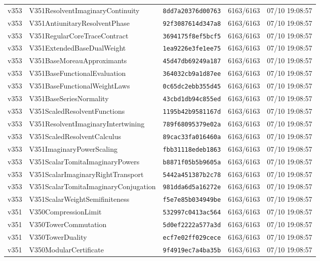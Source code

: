 \documentclass[11pt]{article}
\theoremstyle{definition}\newtheorem{deriv}{Derivation}
\begin{document}
{\begin{longtable}{@{}lllll@{}}
v353 & V351ResolventImaginaryContinuity & \texttt{8dd7a20376d00763} & 6163/6163 & 07/10 19:08:57 \\
v353 & V351AntiunitaryResolventPhase & \texttt{92f3087614d347a8} & 6163/6163 & 07/10 19:08:57 \\
v353 & V351RegularCoreTraceContract & \texttt{3694175f8ef5bcf5} & 6163/6163 & 07/10 19:08:57 \\
v353 & V351ExtendedBaseDualWeight & \texttt{1ea9226e3fe1ee75} & 6163/6163 & 07/10 19:08:57 \\
v353 & V351BaseMoreauApproximants & \texttt{45d47db69249a187} & 6163/6163 & 07/10 19:08:57 \\
v353 & V351BaseFunctionalEvaluation & \texttt{364032cb9a1d87ee} & 6163/6163 & 07/10 19:08:57 \\
v353 & V351BaseFunctionalWeightLaws & \texttt{0c65dc2ebb355d45} & 6163/6163 & 07/10 19:08:57 \\
v353 & V351BaseSeriesNormality & \texttt{43cbd1db94c855ed} & 6163/6163 & 07/10 19:08:57 \\
v353 & V351ScaledResolventFunctions & \texttt{1195b42b9581167d} & 6163/6163 & 07/10 19:08:57 \\
v353 & V351ResolventImaginaryIntertwining & \texttt{789f68095379e02a} & 6163/6163 & 07/10 19:08:57 \\
v353 & V351ScaledResolventCalculus & \texttt{89cac33fa016460a} & 6163/6163 & 07/10 19:08:57 \\
v353 & V351ImaginaryPowerScaling & \texttt{fbb31118edeb1863} & 6163/6163 & 07/10 19:08:57 \\
v353 & V351ScalarTomitaImaginaryPowers & \texttt{b8871f05b5b9605a} & 6163/6163 & 07/10 19:08:57 \\
v353 & V351ScalarImaginaryRightTransport & \texttt{5442a451387b2c78} & 6163/6163 & 07/10 19:08:57 \\
v353 & V351ScalarTomitaImaginaryConjugation & \texttt{981dda6d5a16272e} & 6163/6163 & 07/10 19:08:57 \\
v353 & V351ScalarWeightSemifiniteness & \texttt{f5e7e85b034949be} & 6163/6163 & 07/10 19:08:57 \\
v351 & V350CompressionLimit & \texttt{532997c0413ac564} & 6163/6163 & 07/10 19:08:57 \\
v351 & V350TowerCommutation & \texttt{5d0ef2222a577a3d} & 6163/6163 & 07/10 19:08:57 \\
v351 & V350TowerDuality & \texttt{ecf7e02ff029cece} & 6163/6163 & 07/10 19:08:57 \\
v351 & V350ModularCertificate & \texttt{9f4919ec7a4ba35b} & 6163/6163 & 07/10 19:08:57 \\

\end{longtable}}
\end{document}
